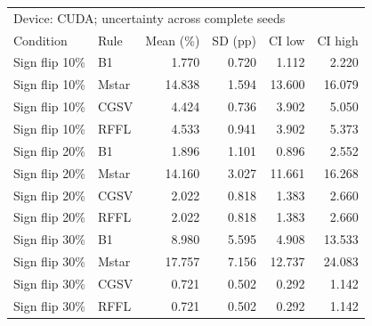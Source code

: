 \begin{tabular}{llrrrr}
\toprule
\multicolumn{6}{l}{Device: CUDA; uncertainty across complete seeds} \\
Condition & Rule & Mean (\%) & SD (pp) & CI low & CI high \\
\midrule
Sign flip 10\% & B1 & 1.770 & 0.720 & 1.112 & 2.220 \\
Sign flip 10\% & Mstar & 14.838 & 1.594 & 13.600 & 16.079 \\
Sign flip 10\% & CGSV & 4.424 & 0.736 & 3.902 & 5.050 \\
Sign flip 10\% & RFFL & 4.533 & 0.941 & 3.902 & 5.373 \\
Sign flip 20\% & B1 & 1.896 & 1.101 & 0.896 & 2.552 \\
Sign flip 20\% & Mstar & 14.160 & 3.027 & 11.661 & 16.268 \\
Sign flip 20\% & CGSV & 2.022 & 0.818 & 1.383 & 2.660 \\
Sign flip 20\% & RFFL & 2.022 & 0.818 & 1.383 & 2.660 \\
Sign flip 30\% & B1 & 8.980 & 5.595 & 4.908 & 13.533 \\
Sign flip 30\% & Mstar & 17.757 & 7.156 & 12.737 & 24.083 \\
Sign flip 30\% & CGSV & 0.721 & 0.502 & 0.292 & 1.142 \\
Sign flip 30\% & RFFL & 0.721 & 0.502 & 0.292 & 1.142 \\
\bottomrule
\end{tabular}
